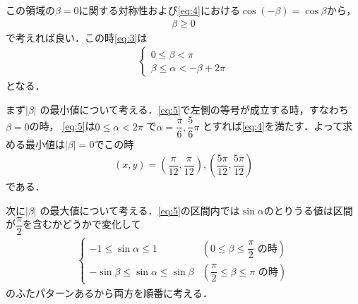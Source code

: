\documentclass[../../main.tex]{subfiles}
\begin{document}
この領域の$\beta=0$に関する対称性および\cref{eq:4}における$\cos(-\beta) = \cos\beta$から，
\begin{align}
  \beta \ge 0
\end{align}
で考えれば良い．この時\cref{eq:3}は
\begin{align}
  \begin{cases}
    0 \le \beta < \pi \\
    \beta \le \alpha < -\beta + 2\pi
  \end{cases} \label{eq:5}
\end{align}
となる．

まず$|\beta|$ の最小値について考える．\cref{eq:5}で左側の等号が成立する時，すなわち$\beta=0$の時，
\cref{eq:5}は$0 \le \alpha < 2\pi$ で$\alpha = \dfrac{\pi}{6}, \dfrac{5}{6}\pi$ とすれば\cref{eq:4}を満たす．よって求める最小値は$|\beta|=0$でこの時
\begin{align}
  (x,y) =  \left(\dfrac{\pi}{12}, \dfrac{\pi}{12}\right), \left(\dfrac{5\pi}{12}, \dfrac{5\pi}{12}\right) \label{eq:6}
\end{align}
である．

次に$|\beta|$ の最大値について考える．\cref{eq:5}の区間内では$\sin \alpha$のとりうる値は区間が$\dfrac{\pi}{2}$を含むかどうかで変化して
\begin{align}
  \begin{cases}
    -1 \le \sin\alpha \le 1                  & \left(0 \le \beta \le \dfrac{\pi}{2} \text{ の時}\right) \\
    -\sin\beta \le \sin\alpha \le \sin\beta  & \left(\dfrac{\pi}{2} \le \beta \le \pi \text{ の時} \right)
  \end{cases}\label{eq:7}
\end{align}
のふたパターンあるから両方を順番に考える．
\end{document}
